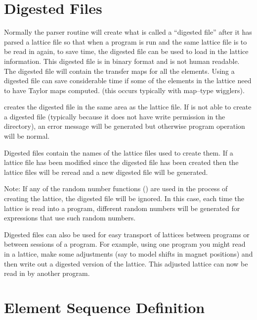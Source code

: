 \section{Digested Files}
\label{s:digested}

Normally the \bmad parser routine will create what is called a
``digested file'' after it has parsed a lattice file so that when a
program is run and the same lattice file is to be read in again, to save
time, the digested file can be used to load in the lattice information.
This digested file is in binary format and is not human readable. The
digested file will contain the transfer maps for all the elements. 
Using a digested file can save considerable time if some of the
elements in the lattice need to have Taylor maps computed.
(this occurs typically with map--type wigglers).

\bmad creates the digested file in the same area as the lattice file.
If \bmad is not able to create a digested file (typically because it
does not have write permission in the directory), an error message will
be generated but otherwise program operation will be normal.

Digested files contain the names of the lattice files used to create
them. If a lattice file has been modified since the digested file has
been created then the lattice files will be reread and a new
digested file will be generated. 

Note: If any of the random number functions () are
used in the process of creating the lattice, the digested file will be
ignored. In this case, each time the lattice is read into a program,
different random numbers will be generated for expressions that use such
random numbers.

Digested files can also be used for easy transport of lattices between
programs or between sessions of a program. For example, using one
program you might read in a lattice, make some adjustments (say to model
shifts in magnet positions) and then write out a digested version of the
lattice. This adjusted lattice can now be read in by another program.

\section{Element Sequence Definition}

